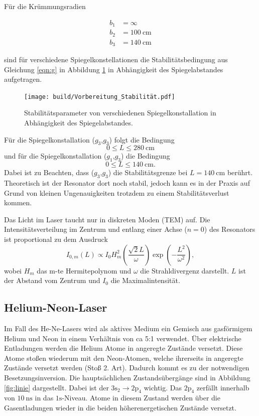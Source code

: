 Für die Krümmungsradien

\begin{align*}
    b_1 & = \infty \\
    b_2 & = \SI{100}{\centi\m} \\
    b_3 & = \SI{140}{\centi\m}
\end{align*}

sind für verschiedene Spiegelkonstellationen die Stabilitätsbedingung aus Gleichung \eqref{eqn:g} in Abbildung \ref{fig:vor} in Abhängigkeit des Spiegelabstandes aufgetragen.

\begin{figure}
    \centering
    \texttt{[image: build/Vorbereitung\_Stabilität.pdf]}
    \caption{Stabilitätsparameter von verschiedenen Spiegelkonstallation in Abhängigkeit des Spiegelabstandes.}
    \label{fig:vor}
\end{figure}

Für die Spiegelkonstallation ($g_3$,$g_3$) folgt die Bedingung
\begin{equation}
    0 \leq L \leq \SI{280}{\cm}
\end{equation}
und für die Spiegelkonstallation ($g_1$,$g_3$) die Bedingung
\begin{equation}
    0 \leq L \leq \SI{140}{\cm}.
\end{equation}
Dabei ist zu Beachten, dass ($g_3$,$g_3$) die Stabilitätsgrenze bei $L = \SI{140}{\cm}$ berührt. Theoretisch ist der Resonator dort noch stabil, jedoch kann es in der Praxis auf Grund von kleinen Ungenauigkeiten trotzdem zu einem Stabilitätsverlust kommen.


\subject{Moden im Resonator}

Das Licht im Laser taucht nur in diskreten Moden (TEM) auf. 
Die Intensitätsverteilung im Zentrum und entlang einer Achse ($n=0$) des Resonators ist proportional zu dem Ausdruck 
\begin{equation}
    \label{eqn:mode}
    I_{0,m}(L) \propto I_0 H_m^2\left(\frac{\sqrt{2}L}{\omega}\right)\exp{\left(-\frac{L^2}{\omega^2}\right)},
\end{equation}
wobei $H_m$ das m-te Hermitepolynom und $\omega$ die Strahldivergenz darstellt. $L$ ist der Abstand vom Zentrum und $I_0$ die Maximalintensität.

\subsection{Helium-Neon-Laser}
Im Fall des He-Ne-Lasers wird als aktives Medium ein Gemisch aus gasförmigem Helium und Neon in einem Verhältnis von ca 5:1 verwendet.
Über elektrische Entladungen werden die Helium Atome in angeregte Zustände versetzt. Diese Atome stoßen wiederum mit den Neon-Atomen, welche ihrerseits in angeregte Zustände versetzt werden (Stoß 2. Art). Dadurch kommt es zu der notwendigen Besetzungsinversion. Die hauptsächlichen Zustandsübergänge sind in Abbildung \ref{fig:linie} dargestellt. Dabei ist der $3\text{s}_2 \to 2\text{p}_4$ wichtig. Das $2\text{p}_4$ zerfällt innerhalb von $\SI{10}{\nano\s}$ in das $1\text{s}$-Niveau. Atome in diesem Zustand werden über die Gasentladungen wieder in die beiden höherenergetischen Zustände versetzt.


